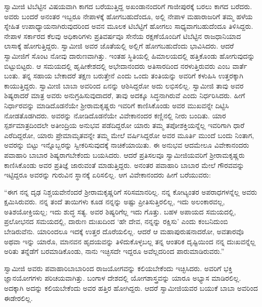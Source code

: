  ಸ್ವಾಮೀಜಿ ಟಿಬೆಟ್ಟಿನ ವಿಷಯವಾಗಿ ಕಾಗದ ಬರೆಯುತ್ತಿದ್ದ ಅಖಂಡಾನಂದರಿಗೆ ಗಾಜೀಪುರಕ್ಕೆ ಬರಲು ಕಾಗದ ಬರೆದರು. ಅವರು ಬಂದರೆ ಅನಂತರ ಇಬ್ಬರೂ ನೇಪಾಳಕ್ಕೆ ಹೋಗಬಹುದೆಂದೂ, ಅಲ್ಲಿ ನೇಪಾಳ ಮಹಾರಾಜರಿಗೆ ತಮ್ಮ ಹಳೆಯ ಸ್ನೇಹಿತ ಉಪಾಧ್ಯಾಯನಾಗಿರುವುದರಿಂದ ಅವನ ಮೂಲಕ ಟಿಬೆಟ್ಟಿಗೆ ಹೋಗಲು ಸಾಧ್ಯವಾಗಬಹುದೆಂದೂ ತಿಳಿಸಿದ್ದರು. ನೇಪಾಳ ಸರ್ಕಾರದ ಕೆಲವು ಅಧಿಕಾರಿಗಳು ಪ್ರತಿವರ್ಷವೂ ಸೇನೆಯ ರಕ್ಷಣೆಯೊಂದಿಗೆ ಟಿಬೆಟ್ಟಿನ ರಾಜಧಾನಿಯಾದ ಲಾಸಾಕ್ಕೆ ಹೋಗುತ್ತಿದ್ದರು. ಸ್ವಾಮೀಜಿ ಅವರ ಜೊತೆಯಲ್ಲಿ ಅಲ್ಲಿಗೆ ಹೋಗಬಹುದೆಂದು ಭಾವಿಸಿದರು. ಆದರೆ ಸ್ವಾಮೀಜಿಗೆ ಸೊಂಟ ನೋವು ದಾರುಣವಾಗಿತ್ತು. ಇಂತಹ ಸ್ಥಿತಿಯಲ್ಲಿ ಹಿಮಾಲಯದಲ್ಲಿ ಹತ್ತಿಕೊಂಡು ಹೋಗುವುದನ್ನು ಬಿಟ್ಟುಬಿಟ್ಟರು. ಆ ಸಮಯದಲ್ಲಿ ಹೃಷೀಕೇಶದಲ್ಲಿ ಅಭೇದಾನಂದರು ಅತಿಸಾರದಿಂದ ನರಳುತ್ತಿರುವರು ಎಂಬ ವಾರ್ತೆ ಬಂತು. ತನ್ನ ಸಹಾಯ ಬೇಕಾದರೆ ತಕ್ಷಣ ಬರುತ್ತೇನೆ ಎಂದು ಒಂದು ತಂತಿಯನ್ನು ಅವರಿಗೆ ಕಳುಹಿಸಿ ಉತ್ತರಕ್ಕಾಗಿ ಕಾಯುತ್ತಿದ್ದರು. ಸ್ವಾಮೀಜಿ ಬಾಬಾ ಅವರಿಂದ ಏನನ್ನು ಆಶಿಸಿದ್ದರೋ ಅದು ಲಭಿಸಲಿಲ್ಲ. ಸ್ವಾಮೀಜಿ ತಾವು ಅವರ ಶಿಷ್ಯರಾದರೆ ಮಾತ್ರ ಅವರು ಅನುಗ್ರಹಿಸುವುದಾದರೆ, ತಾವು ಅದಕ್ಕೂ ಸಿದ್ಧನಾಗಿರುವೆ ಎಂದು ನಿರ್ಧರಿಸಿದರು. ಹೀಗೆ ನಿರ್ಧಾರವನ್ನು ಮಾಡಿದೊಡನೆಯೇ ಶ‍್ರೀರಾಮಕೃಷ್ಣರು ಇವರಿಗೆ ಕಾಣಿಸಿಕೊಂಡು ಅವರ ಮುಖವನ್ನೇ ದಿಟ್ಟಿಸಿ ನೋಡತೊಡಗಿದರು. ಅವರನ್ನು ನೋಡಿದೊಡನೆಯೇ ವಿವೇಕಾನಂದರ ಕಣ್ಣಿನಲ್ಲಿ ನೀರು ಬಂದಿತು. ಯಾರ ಸ್ಪರ್ಶಮಾತ್ರದಿಂದಲೇ ಅತೀಂದ್ರಿಯ ಅನುಭವ ಪಡೆದಿದ್ದರೋ ಯಾರು ತಮ್ಮ ತಪೋಶಕ್ತಿಯನ್ನೆಲ್ಲ ಇವರಿಗಾಗಿ ಧಾರೆ ಎರೆದಿದ್ದರೋ, ಯಾರು ಪ್ರೇಮಾಮೃತವನ್ನೇ ತಮ್ಮ ಮೇಲೆ ವರ್ಷಿಸಿದ್ದರೋ ಅವರ ಮೂರ್ತಿ ಮುಂದೆ ಬಂದು ನಿಂತಾಗ, ಅವರನ್ನು ಬಿಟ್ಟು ಇನ್ನೊಬ್ಬರನ್ನು ಸ್ವೀಕರಿಸುವುದಕ್ಕೆ ನಾಚಿಕೆಯಾಯಿತು. ಈ ಅನುಭವ ಆದಮೇಲೂ ವಿವೇಕಾನಂದರು ಪವಾಹಾರಿ ಬಾಬಾರ ಶಿಷ್ಯರಾಗಬೇಕೆಂದು ಬಯಸಿದರು. ಆದರೆ ಪ್ರತಿಸಲವೂ ಸ್ವಾಮೀಜಿಯವರಿಗೆ ಶ‍್ರೀರಾಮಕೃಷ್ಣರು ಕಾಣಿಸಿಕೊಂಡು ಅವರ ಪ್ರತಿಜ್ಞೆ ಜಾರುವಂತೆ ಮಾಡುತ್ತಿದ್ದರು. ಅನಂತರ ಪವಾಹಾರಿ ಬಾಬಾರ ಮೇಲೆ ಗೌರವವನ್ನು ಇಟ್ಟಿದ್ದರೂ ಅವರನ್ನು ಗುರುವಿನ ಸ್ಥಾನಕ್ಕೆ ಏರಿಸಲಿಲ್ಲ. ಆಗ ವಿವೇಕಾನಂದರು ಹೀಗೆ ಬರೆಯುವರು: 

 “ಈಗ ನನ್ನ ದೃಢ ನಿಶ್ಚಯವೇನೆಂದರೆ ಶ‍್ರೀರಾಮಕೃಷ್ಣರಿಗೆ ಸರಿಸಮಾನರಿಲ್ಲ. ನನ್ನ ಕೋಟ್ಯಂತರ ಅಪರಾಧಗಳನ್ನೆಲ್ಲ ಅವರು ಕ್ಷಮಿಸಿರುವರು. ನನ್ನ ತಂದೆ ತಾಯಿಗಳು ಕೂಡ ನನ್ನನ್ನು ಅಷ್ಟು ಪ್ರೀತಿಸುತ್ತಿರಲಿಲ್ಲ, ಇದು ಅಲಂಕಾರವಲ್ಲ, ಅತಿಶಯೋಕ್ತಿಯಲ್ಲ; ಇದು ಶುದ್ಧ ಸತ್ಯ. ಅವರ ಶಿಷ್ಯರಿಗೆಲ್ಲ ಇದು ಗೊತ್ತು. ಬಹಳ ಅಪಾಯದ ಸಮಯದಲ್ಲಿ, ಪ್ರಲೋಭನದ ಸಮಯದಲ್ಲಿ, ದಾರುಣ ದುಃಖದಿಂದ ‘ಹೇ ದೇವ, ನನ್ನನ್ನು ರಕ್ಷಿಸು’ ಎಂದು ಕಂಬನಿದುಂಬಿ ಬೇಡಿರುವೆನು. ಯಾರಿಂದಲೂ ಇದಕ್ಕೆ ಉತ್ತರ ದೊರೆಯಲಿಲ್ಲ. ಆದರೆ ಆ ಮಹಾಪುರುಷನಾದರೋ, ಅವತಾರವೊ ಅಥವಾ ಇನ್ನು ಯಾರೊ, ಮಾನವನ ಹೃದಯವನ್ನು ತಿಳಿದುಕೊಳ್ಳಬಲ್ಲ ತನ್ನ ಆಂತರಿಕ ದೃಷ್ಟಿಯಿಂದ ನನ್ನ ದುಃಖವನ್ನೆಲ್ಲ ಅರಿತು ತನ್ನೆಡೆಗೆ ಬರಮಾಡಿಕೊಂಡು, ನಾನು ಇಚ್ಛಿಸದೇ ಇದ್ದರೂ ಅವೆಲ್ಲದರಿಂದ ಪಾರುಮಾಡಿರುವರು.” 

 ಸ್ವಾಮೀಜಿ ಅವರು ಪವಾಹಾರಿಬಾಬಾರಿಂದ ರಾಜಯೋಗವನ್ನು ಕಲಿಯಬೇಕೆಂದು ಇಚ್ಛಿಸಿದರು. ಅವರಿಗೆ ಭಕ್ತಿ ಜ್ಞಾನಯೋಗಗಳು ಪರಿಚಯವಾಗಿತ್ತು. ಬಂಗಾಳ ದೇಶದಲ್ಲಿ ಯೋಗಶಾಸ್ತ್ರವನ್ನು ಯಾರೂ ಅಭ್ಯಾಸ ಮಾಡಿರಲಿಲ್ಲ. ಅದಕ್ಕಾಗಿ ಅದನ್ನು ಕಲಿಯಬೇಕೆಂದು ಅವರ ಹತ್ತಿರ ಹೋಗಿದ್ದರು. ಆದರೆ ಸ್ವಾಮೀಜಿಯವರ ಬಯುಕೆ ಬಾಬಾ ಅವರಿಂದ ಈಡೇರಲಿಲ್ಲ. 

